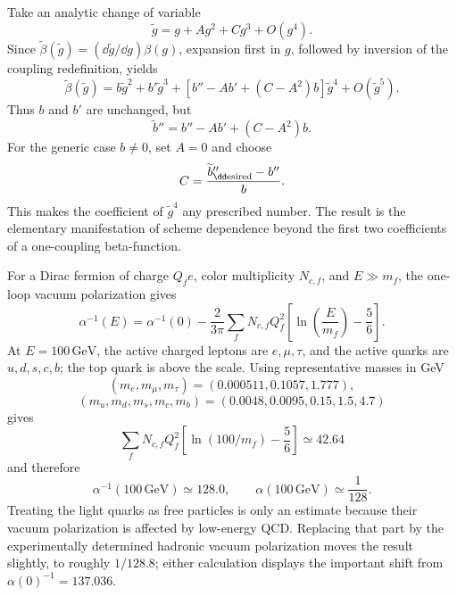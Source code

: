\begin{enumerate}
  Take an analytic change of variable
  \[
    \widetilde g=g+A g^2+C g^3+O(g^4).
  \]
  Since
  \(\widetilde\beta(\widetilde g)
    =(\dd\widetilde g/\dd g)\beta(g)\), expansion first in \(g\), followed by
  inversion of the coupling redefinition, yields
  \[
    \widetilde\beta(\widetilde g)
      =b\widetilde g^2+b'\widetilde g^3+
       \left[b''-Ab'+(C-A^2)b\right]\widetilde g^4
       +O(\widetilde g^5).
  \]
  Thus \(b\) and \(b'\) are unchanged, but
  \[
    \widetilde b''=b''-Ab'+(C-A^2)b.
  \]
  For the generic case \(b\neq0\), set \(A=0\) and choose
  \[
    C=\frac{\widetilde b''_{\rm \dd esired}-b''}{b}.
  \]
  This makes the coefficient of \(\widetilde g^4\) any prescribed number.
  The result is the elementary manifestation of scheme dependence beyond
  the first two coefficients of a one-coupling beta-function.

  For a Dirac fermion of charge \(Q_f e\), color multiplicity \(N_{c,f}\),
  and \(E\gg m_f\), the one-loop vacuum polarization gives
  \[
    \alpha^{-1}(E)=\alpha^{-1}(0)
      -\frac{2}{3\pi}\sum_f N_{c,f}Q_f^2
       \left[\ln\left(\frac{E}{m_f}\right)-\frac56\right].
  \]
  At \(E=100\,\mathrm{GeV}\), the active charged leptons are
  \(e,\mu,\tau\), and the active quarks are \(u,d,s,c,b\); the top quark is
  above the scale.  Using representative masses in GeV
  \[
    (m_e,m_\mu,m_\tau)=(0.000511,0.1057,1.777),
  \]
  \[
    (m_u,m_d,m_s,m_c,m_b)=(0.0048,0.0095,0.15,1.5,4.7)
  \]
  gives
  \[
    \sum_f N_{c,f}Q_f^2
      \left[\ln(100/m_f)-\frac56\right]\simeq42.64
  \]
  and therefore
  \[
    \boxed{\alpha^{-1}(100\,\mathrm{GeV})\simeq128.0,
      \qquad \alpha(100\,\mathrm{GeV})\simeq\frac1{128}.}
  \]
  Treating the light quarks as free particles is only an estimate because
  their vacuum polarization is affected by low-energy QCD.  Replacing that
  part by the experimentally determined hadronic vacuum polarization moves
  the result slightly, to roughly \(1/128.8\); either calculation displays
  the important shift from \(\alpha(0)^{-1}=137.036\).


\end{enumerate}
